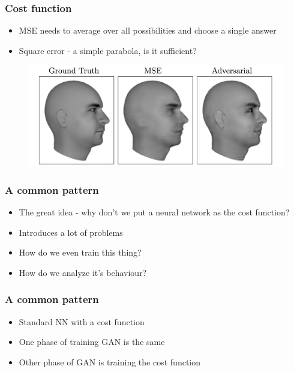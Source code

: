 \documentclass{beamer}
\begin{document}
\begin{frame}
	\frametitle{Cost function}
	\begin{itemize}
		\item MSE needs to average over all possibilities and choose a single answer
		\item Square error - a simple parabola, is it sufficient?
	\end{itemize}
	\begin{figure}[h!]
		\centering
		\includegraphics[width=\textwidth]{mse_vs_adversarial.png}
	\end{figure}
\end{frame}
\begin{frame}
	\frametitle{A common pattern}
	\begin{itemize}
		\item The great idea - why don't we put a neural network as the cost function?
		\item Introduces a lot of problems
		\item How do we even train this thing?
		\item How do we analyze it's behaviour?
	\end{itemize}
\end{frame}

\begin{frame}
	\frametitle{A common pattern}
	\begin{itemize}
		\item Standard NN with a cost function
		\item One phase of training GAN is the same 
		\item Other phase of GAN is training the cost function
	\end{itemize}
\end{frame}
\end{document}

